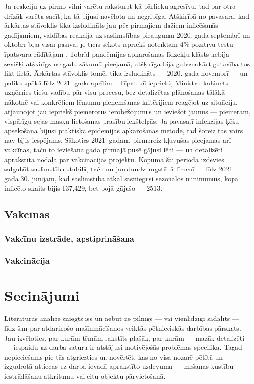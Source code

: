 \documentclass[12pt, a4paper]{article}
\numberwithin{equation}{section} %
\begin{document}
Ja reakciju uz pirmo vilni varētu raksturot kā pārlieku agresīvu, tad par otro drīzāk varētu sacīt, ka tā bijusi novēlota un negribīga. Atšķirībā no pavasara, kad ārkārtas stāvoklis tika izsludināts jau pēc pirmajiem dažiem inficēšanās gadījumiem, valdības reakcija uz saslimstības pieaugumu 2020. gada septembrī un oktobrī bija visai pasīva, jo ticis sekots iepriekš noteiktam 4\% pozitīvu testu īpatsvara rādītājam \cite{lv_october_2020_spread}. Tobrīd pandēmijas apkarošanas līdzekļu klāsts nebija sevišķi atšķirīgs no gada sākumā pieejamā, atšķirīga bija galvenokārt gatavība tos likt lietā. Ārkārtas stāvoklis tomēr tika izsludināts --- 2020. gada novembrī --- un palika spēkā līdz 2021. gada aprīlim \cite{lv_emergency_2020_fall}. Tāpat kā iepriekš, Ministru kabinets uzņēmies tiešu vadību pār visu procesu, bez detalizētas plānošanas tālākā nākotnē vai konkrētiem lēmumu pieņemšanas kritērijiem reaģējot uz situāciju, atjaunojot jau iepriekš piemērotus ierobežojumus un ieviešot jaunus --- piemēram, vispārīgu sejas masku lietošanas prasību iekštelpās. Ja pavasarī infekcijas ķēžu apsekošana bijusi praktiska epidēmijas apkarošanas metode, tad šoreiz tas vairs nav bijis iespējams. Sākoties 2021. gadam, pirmoreiz kļuvušas pieejamas arī vakcīnas, taču to ieviešana gada pirmajā pusē gājusi lēni --- un detalizēti aprakstīta nodaļā par vakcinācijas projektu. Kopumā šai periodā izdevies salgabāt saslimstību stabilā, taču nu jau daudz augstākā līmenī --- līdz 2021. gada 30. jūnijam, kad saslimstība atkal sasniegusi sezonālos minimumus, kopā inficēto skaits bijis 137,429, bet bojā gājušo --- 2513.

\subsection{Vakcīnas}

\subsubsection{Vakcīnu izstrāde, apstiprināšana}

\subsubsection{Vakcinācija}


\newpage
\section{Secinājumi}

Literatūras analīzē sniegts īss un nebūt ne pilnīgs --- vai vienlīdzīgi sadalīts --- līdz šim par atdarinošo mašīnmācīšanos veiktās pētnieciskās darbības pārskats. Jau izvēloties, par kurām tēmām rakstīts plašāk, par kurām --- mazāk detalizēti --- iespaidu uz darba saturu ir atstājusi motivējošās problēmas specifika. Tagad nepieciešams pie tās atgriezties un novērtēt, kas no visa nozarē pētītā un izgudrotā attiecas uz darba ievadā aprakstīto uzdevumu --- mešanas kustību iestrādāšanu atkritumu vai citu objektu pārvietošanā.
\end{document}
